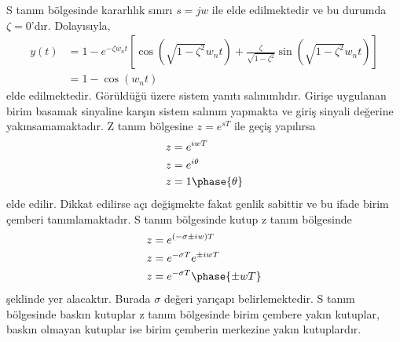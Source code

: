 S tanım bölgesinde kararlılık sınırı $s=jw$ ile elde edilmektedir ve bu durumda $\zeta=0$'dır. Dolayısıyla,
\begin{equation}
\begin{split}
    y(t)&=1-e^{-\zeta w_nt}\left[\cos(\sqrt{1-\zeta^2}w_nt)+\frac{\zeta}{\sqrt{1-\zeta^2}}\sin(\sqrt{1-\zeta^2}w_nt)\right]\\
    &=1-\cos(w_nt)
\end{split}
\end{equation}
elde edilmektedir. Görüldüğü üzere sistem yanıtı salınımlıdır. Girişe uygulanan birim basamak sinyaline karşın sistem salınım yapmakta ve giriş sinyali değerine yakınsamamaktadır. Z tanım bölgesine $z=e^{sT}$ ile geçiş yapılırsa
\begin{equation}
    \begin{split}
        z&=e^{iwT}\\
        z&=e^{i\theta}\\
        z&=1\phase{ \theta}
    \end{split}
\end{equation}
elde edilir. Dikkat edilirse açı değişmekte fakat genlik sabittir ve bu ifade birim çemberi tanımlamaktadır. S tanım bölgesinde kutup z tanım bölgesinde 
\begin{equation}
    \begin{split}
        z&=e^{(-\sigma\pm iw) T}\\
        z&=e^{-\sigma T}e^{\pm iwT}\\
        z&=e^{-\sigma T}\phase{\pm wT}
    \end{split}
\end{equation}
şeklinde yer alacaktır. Burada $\sigma$ değeri yarıçapı belirlemektedir. S tanım bölgesinde baskın kutuplar z tanım bölgesinde birim çembere yakın kutuplar, baskın olmayan kutuplar ise birim çemberin merkezine yakın kutuplardır.
